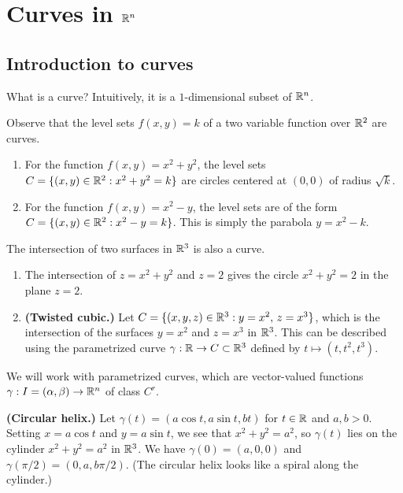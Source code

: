 \section{Curves in $\mathbb{R}^n$}\label{sec:2}

\subsection{Introduction to curves}\label{subsec:2.1}
What is a curve? Intuitively, it is a $1$-dimensional subset of $\mathbb{R}^n$. 

Observe that the level sets $f(x, y) = k$ of a two variable function over $\mathbb{R}^2$ are curves. 
\begin{enumerate}[(1)]
    \item For the function $f(x, y) = x^2 + y^2$, the level sets 
    $C = \{(x, y) \in \mathbb{R}^2 : x^2 + y^2 = k\}$ are circles centered at 
    $(0, 0)$ of radius $\sqrt{k}$. 
    \item For the function $f(x, y) = x^2 - y$, the level sets are of the form 
    $C = \{(x, y) \in \mathbb{R}^2 : x^2 - y = k\}$.
    This is simply the parabola $y = x^2 - k$.
\end{enumerate}

The intersection of two surfaces in $\mathbb{R}^3$ is also a curve. 
\begin{enumerate}[(1)]
    \item The intersection of $z = x^2 + y^2$ and $z = 2$ gives the circle 
    $x^2 + y^2 = 2$ in the plane $z = 2$. 

    \item {\bf (Twisted cubic.)} Let $C = \{(x, y, z) \in \mathbb{R}^3 : 
    y = x^2,\, z = x^3\}$, which is the intersection of the surfaces 
    $y = x^2$ and $z = x^3$ in $\mathbb{R}^3$. This can be described using the parametrized 
    curve $\gamma : \mathbb{R} \to C \subset \mathbb{R}^3$ defined by $t \mapsto (t, t^2, t^3)$.
\end{enumerate}

We will work with parametrized curves, which are 
vector-valued functions $\gamma : I = (\alpha, \beta) \to \mathbb{R}^n$ of class $C^r$.

{\bf (Circular helix.)} Let $\gamma(t) = (a\cos t, a\sin t, bt)$ for $t \in \mathbb{R}$ and $a, b > 0$. 
Setting $x = a\cos t$ and $y = a\sin t$, we see that $x^2 + y^2 = a^2$, so 
$\gamma(t)$ lies on the cylinder $x^2 + y^2 = a^2$ in $\mathbb{R}^3$. 
We have $\gamma(0) = (a, 0, 0)$ and $\gamma(\pi/2) = (0, a, b\pi/2)$. (The circular helix 
looks like a spiral along the cylinder.)

